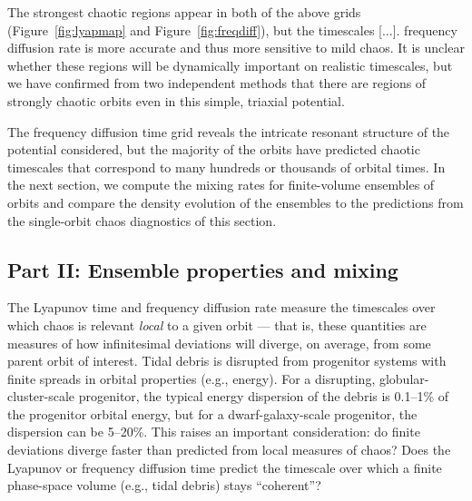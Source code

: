 \documentclass[letterpaper,12pt,preprint]{aastex}
\begin{document}
The strongest chaotic regions appear in both of the above grids (Figure~\ref{fig:lyapmap} and Figure~\ref{fig:freqdiff}), but the timescales [...]. frequency diffusion rate is more accurate and thus more sensitive to mild chaos. It is unclear whether these regions will be dynamically important on realistic timescales, but we have confirmed from two independent methods that there are regions of strongly chaotic orbits even in this simple, triaxial potential.

The frequency diffusion time grid reveals the intricate resonant structure of the potential considered, but the majority of the orbits have predicted chaotic timescales that correspond to many hundreds or thousands of orbital times. In the next section, we compute the mixing rates for finite-volume ensembles of orbits and compare the density evolution of the ensembles to the predictions from the single-orbit chaos diagnostics of this section.

\subsection{Part II: Ensemble properties and mixing} \label{sec:results2}

The Lyapunov time and frequency diffusion rate measure the timescales over which chaos is relevant \emph{local} to a given orbit --- that is, these quantities are measures of how infinitesimal deviations will diverge, on average, from some parent orbit of interest. Tidal debris is disrupted from progenitor systems with finite spreads in orbital properties (e.g., energy). For a disrupting, globular-cluster-scale progenitor, the typical energy dispersion of the debris is 0.1--1\% of the progenitor orbital energy, but for a dwarf-galaxy-scale progenitor, the dispersion can be 5--20\%. This raises an important consideration: do finite deviations diverge faster than predicted from local measures of chaos? Does the Lyapunov or frequency diffusion time predict the timescale over which a finite phase-space volume (e.g., tidal debris) stays ``coherent''?
\end{document}

